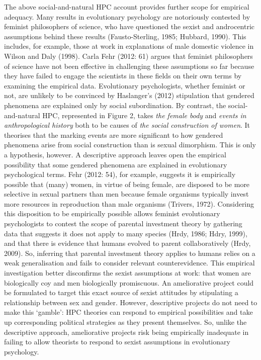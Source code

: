 The above social-and-natural HPC account provides further scope for
empirical adequacy. Many results in evolutionary psychology are
notoriously contested by feminist philosophers of science, who have
questioned the sexist and androcentric assumptions behind these results
(Fausto-Sterling, 1985; Hubbard, 1990). This includes, for example,
those at work in explanations of male domestic violence in Wilson and
Daly (1998). Carla Fehr (2012: 61) argues that feminist philosophers of
science have not been effective in challenging these assumptions so far
because they have failed to engage the scientists in these fields on
their own terms by examining the empirical data. Evolutionary
psychologists, whether feminist or not, are unlikely to be convinced by
Haslanger's (2012) stipulation that gendered phenomena are explained
only by social subordination. By contrast, the social-and-natural HPC,
represented in Figure 2, takes \emph{the female body} and \emph{events
in anthropological history} both to be causes of \emph{the social
construction of women}. It theorises that the marking events are more
significant to how gendered phenomena arise from social construction
than is sexual dimorphism. This is only a hypothesis, however. A
descriptive approach leaves open the empirical possibility that some
gendered phenomena are explained in evolutionary psychological terms.
Fehr (2012: 54), for example, suggests it is empirically possible that
(many) women, in virtue of being female, are disposed to be more
selective in sexual partners than men because female organisms typically
invest more resources in reproduction than male organisms (Trivers,
1972). Considering this disposition to be empirically possible allows
feminist evolutionary psychologists to contest the scope of parental
investment theory by gathering data that suggests it does not apply to
many species (Hrdy, 1986; Hdry, 1999), and that there is evidence that
humans evolved to parent collaboratively (Hrdy, 2009). So, inferring
that parental investment theory applies to humans relies on a weak
generalisation and fails to consider relevant counterevidence. This
empirical investigation better disconfirms the sexist assumptions at
work: that women are biologically coy and men biologically promiscuous.
An ameliorative project could be formulated to target this exact source
of sexist attitudes by stipulating a relationship between sex and
gender. However, descriptive projects do not need to make this `gamble':
HPC theories can respond to empirical possibilities and take up
corresponding political strategies as they present themselves. So,
unlike the descriptive approach, ameliorative projects risk being
empirically inadequate in failing to allow theorists to respond to
sexist assumptions in evolutionary psychology.

